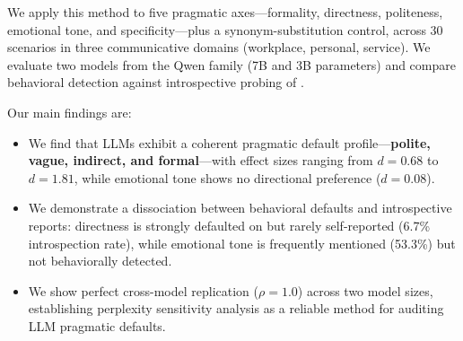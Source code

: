 We apply this method to five pragmatic axes---formality, directness, politeness, emotional tone, and specificity---plus a synonym-substitution control, across 30 scenarios in three communicative domains (workplace, personal, service). We evaluate two models from the Qwen family (7B and 3B parameters) and compare behavioral detection against introspective probing of \gptfour.

Our main findings are:
\begin{itemize}[leftmargin=*,itemsep=0pt,topsep=0pt]
    \item We find that LLMs exhibit a coherent pragmatic default profile---\textbf{polite, vague, indirect, and formal}---with effect sizes ranging from $d{=}0.68$ to $d{=}1.81$, while emotional tone shows no directional preference ($d{=}0.08$).
    \item We demonstrate a dissociation between behavioral defaults and introspective reports: directness is strongly defaulted on but rarely self-reported (6.7\% introspection rate), while emotional tone is frequently mentioned (53.3\%) but not behaviorally detected.
    \item We show perfect cross-model replication ($\rho{=}1.0$) across two model sizes, establishing perplexity sensitivity analysis as a reliable method for auditing LLM pragmatic defaults.
\end{itemize}
